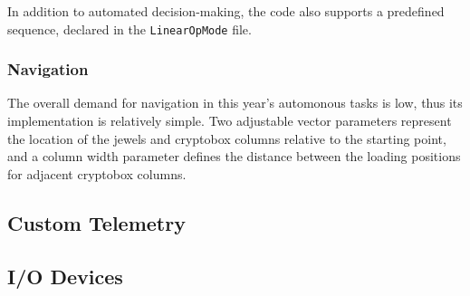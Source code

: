 \documentclass[letterpaper]{article}
\begin{document}
In addition to automated decision-making, the code also supports a predefined sequence, declared in the \texttt{LinearOpMode} file.

\subsubsection{Navigation}
The overall demand for navigation in this year's automonous tasks is low, thus its implementation is relatively simple. Two adjustable vector parameters represent the location of the jewels and cryptobox columns relative to the starting point, and a column width parameter defines the distance between the loading positions for adjacent cryptobox columns.

\subsection{Custom Telemetry}

\subsection{I/O Devices}
\end{document}
